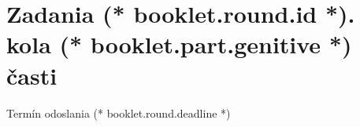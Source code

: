 \documentclass[12pt, twoside]{article}
\newcounter{problem}
\begin{document}
    \loadRegularStyle
	\thispagestyle{first}
	\vspace*{2em}

    {
        \section{\texorpdfstring{Zadania (* booklet.round.id *). kola (* booklet.part.genitive *) časti}{}}
		\centering
		\vspace{-1.3em}
        Termín odoslania (* booklet.round.deadline *)\\[2pt]
    } 
        
	\pagestyle{problems}    
	\loadProblemsStyle
\end{document}

